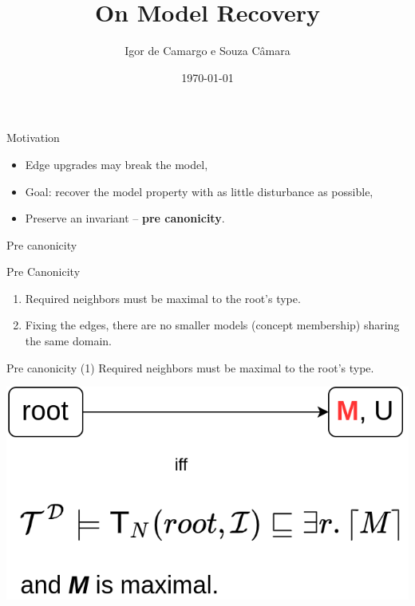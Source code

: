 \documentclass[10pt]{beamer}
\title{On Model Recovery}
\date{\today}
\author{Igor de Camargo e Souza Câmara}
\institute{University of São Paulo}
\begin{document}
\begin{frame}[plain]
  \titlepage
\end{frame}

\begin{frame}[fragile]{Motivation}
  \begin{itemize}
    \item Edge upgrades may break the model, 
    \item Goal: recover the model property with as little disturbance as possible,
    \item Preserve an invariant -- \textbf{pre canonicity}.
  \end{itemize}
\end{frame}

\begin{frame}[fragile]{Pre canonicity}

  {\Large Pre Canonicity}
  
  \begin{enumerate}
    \item Required neighbors must be maximal to the root's type.
    \item Fixing the edges, there are no smaller models (\wrt concept membership) sharing the same domain.
  \end{enumerate}
\end{frame}

\begin{frame}[fragile]{Pre canonicity}
{\Large (1) Required neighbors must be maximal to the root's type.}
\begin{center}
\includegraphics[scale=.35]{img/invariant_1.png}
\end{center}
\end{frame}
\end{document}
